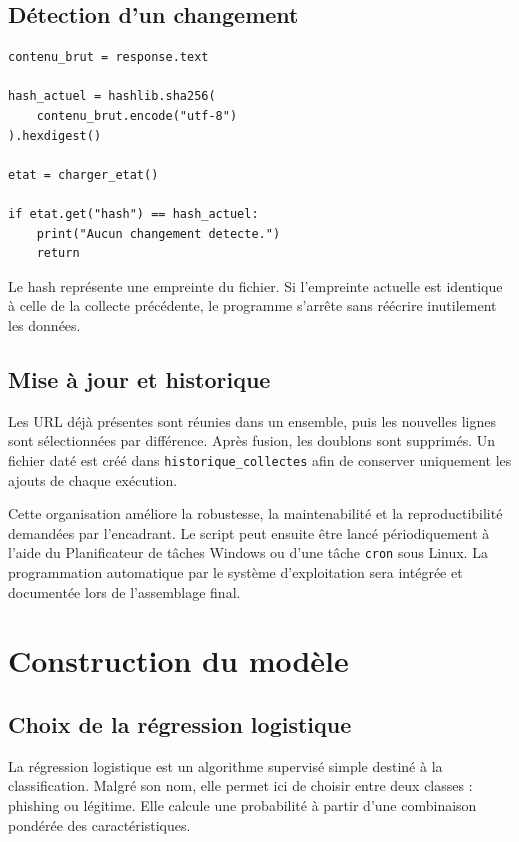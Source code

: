 \documentclass[11pt,a4paper]{report}
\begin{document}
\section{Détection d'un changement}

\begin{lstlisting}[caption={Vérification du contenu téléchargé}]
contenu_brut = response.text

hash_actuel = hashlib.sha256(
    contenu_brut.encode("utf-8")
).hexdigest()

etat = charger_etat()

if etat.get("hash") == hash_actuel:
    print("Aucun changement detecte.")
    return
\end{lstlisting}

Le hash représente une empreinte du fichier. Si l'empreinte actuelle est
identique à celle de la collecte précédente, le programme s'arrête sans
réécrire inutilement les données.

\section{Mise à jour et historique}

Les URL déjà présentes sont réunies dans un ensemble, puis les nouvelles
lignes sont sélectionnées par différence. Après fusion, les doublons sont
supprimés. Un fichier daté est créé dans
\texttt{historique\_collectes} afin de conserver uniquement les ajouts de
chaque exécution.

Cette organisation améliore la robustesse, la maintenabilité et la
reproductibilité demandées par l'encadrant. Le script peut ensuite être lancé
périodiquement à l'aide du Planificateur de tâches Windows ou d'une tâche
\texttt{cron} sous Linux. La programmation automatique par le système
d'exploitation sera intégrée et documentée lors de l'assemblage final.

\chapter{Construction du modèle}

\section{Choix de la régression logistique}

La régression logistique est un algorithme supervisé simple destiné à la
classification. Malgré son nom, elle permet ici de choisir entre deux classes :
phishing ou légitime. Elle calcule une probabilité à partir d'une combinaison
pondérée des caractéristiques.
\end{document}
